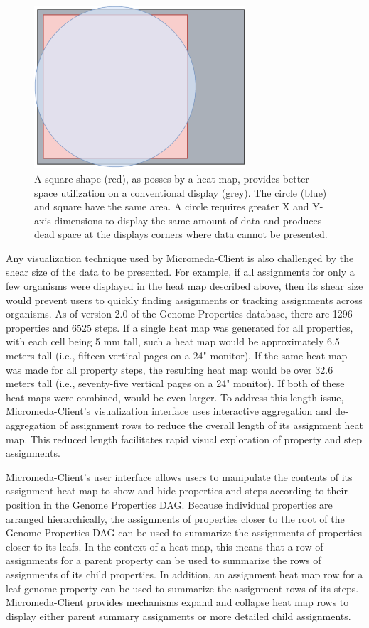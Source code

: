 \begin{figure}[!ht]
  \centering
	\includegraphics[width=0.7\textwidth]{media/square_vs_circle.pdf}
	 \caption{A square shape (red), as posses by a heat map, provides better space utilization on a conventional display (grey). The circle (blue) and square have the same area. A circle requires greater X and Y-axis dimensions to display the same amount of data and produces dead space at the displays corners where data cannot be presented.}
	 \label{fig:circle-square}
\end{figure}

Any visualization technique used by Micromeda-Client is also challenged by the shear size of the data to be presented. For example, if all assignments for only a few organisms were displayed in the heat map described above, then its shear size would prevent users to quickly finding assignments or tracking assignments across organisms. As of version 2.0 of the Genome Properties database, there are 1296 properties and 6525 steps. If a single heat map was generated for all properties, with each cell being 5 mm tall, such a heat map would be approximately 6.5 meters tall (i.e., fifteen vertical pages on a 24" monitor). If the same heat map was made for all property steps, the resulting heat map would be over 32.6 meters tall (i.e., seventy-five vertical pages on a 24" monitor). If both of these heat maps were combined, would be even larger. To address this length issue, Micromeda-Client's visualization interface uses interactive aggregation and de-aggregation of assignment rows to reduce the overall length of its assignment heat map. This reduced length facilitates rapid visual exploration of property and step assignments.

Micromeda-Client's user interface allows users to manipulate the contents of its assignment heat map to show and hide properties and steps according to their position in the Genome Properties DAG. Because individual properties are arranged hierarchically, the assignments of properties closer to the root of the Genome Properties DAG can be used to summarize the assignments of properties closer to its leafs. In the context of a heat map, this means that a row of assignments for a parent property can be used to summarize the rows of assignments of its child properties. In addition, an assignment heat map row for a leaf genome property can be used to summarize the assignment rows of its steps. Micromeda-Client provides mechanisms expand and collapse heat map rows to display either parent summary assignments or more detailed child assignments.

